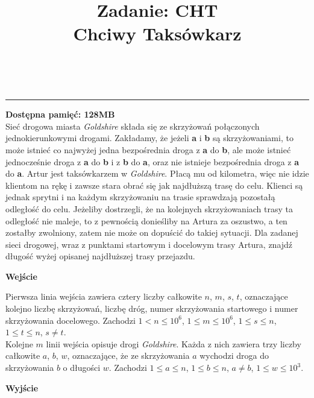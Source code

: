\documentclass{article}
\makeatletter
\renewcommand{\maketitle}{\bgroup\setlength{\parindent}{0pt}
	\textbf{\@title}\egroup
	\\
}
\makeatother
\begin{document}
	\title{\large Zadanie: CHT \\ Chciwy Taksówkarz}\maketitle
	\centering \rule{18cm}{0.5pt} \justifying
	\textbf{Dostępna pamięć: 128MB} \\
	
	Sieć drogowa miasta \textit{Goldshire} składa się ze skrzyżowań połączonych jednokierunkowymi drogami. Zakładamy, że jeżeli \textbf{a} i \textbf{b} są skrzyżowaniami, to może istnieć co najwyżej jedna bezpośrednia droga z \textbf{a} do \textbf{b}, ale może istnieć jednocześnie droga z \textbf{a} do \textbf{b} i z \textbf{b} do \textbf{a}, oraz nie istnieje bezpośrednia droga z \textbf{a} do \textbf{a}.
	\smallbreak
	Artur jest taksówkarzem w \textit{Goldshire}. Płacą mu od kilometra, więc nie idzie klientom na rękę i zawsze stara obrać się jak najdłuższą trasę do celu. Klienci są jednak sprytni i na każdym skrzyżowaniu na trasie sprawdzają pozostałą odległość do celu. Jeżeliby dostrzegli, że na kolejnych skrzyżowaniach trasy ta odległość nie maleje, to z pewnością donieśliby na Artura za oszustwo, a ten zostałby zwolniony, zatem nie może on dopuścić do takiej sytuacji.
	\smallbreak
	Dla zadanej sieci drogowej, wraz z punktami startowym i docelowym trasy Artura, znajdź długość wyżej opisanej najdłuższej trasy przejazdu.
	\begin{flushleft}
		\LARGE \textbf{Wejście}
	\end{flushleft}
	\smallbreak
	
	Pierwsza linia wejścia zawiera cztery liczby całkowite $n$, $m$, $s$, $t$, oznaczające kolejno liczbę skrzyżowań, liczbę dróg, numer skrzyżowania startowego i numer skrzyżowania docelowego. Zachodzi $1 < n \leq 10^6$, $1 \leq m \leq 10^6$, $1 \leq s \leq n$, $1 \leq t \leq n$, $s \neq t$. \\
	Kolejne $m$ linii wejścia opisuje drogi \textit{Goldshire}. Każda z nich zawiera trzy liczby całkowite $a$, $b$, $w$, oznaczające, że ze skrzyżowania $a$ wychodzi droga do skrzyżowania $b$ o długości $w$. Zachodzi $1 \leq a \leq n$, $1 \leq b \leq n$, $a \neq b$, $1 \leq w \leq 10^3$.
	\begin{flushleft}
		\LARGE \textbf{Wyjście}
	\end{flushleft}
	\smallbreak
	
\end{document}
